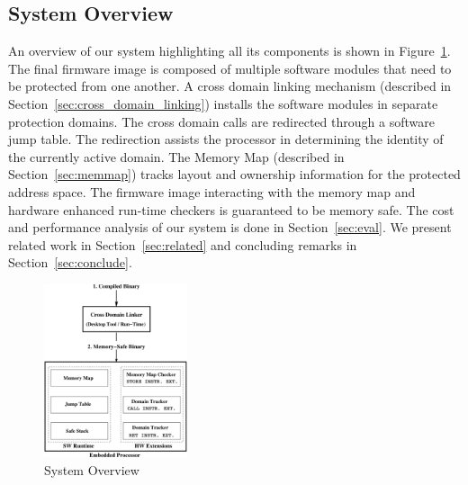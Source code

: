 \subsection{System Overview}
%
An overview of our system highlighting all its components is shown in Figure~\ref{fig:sys_overview}.
%
The final firmware image is composed of multiple software modules that need to be protected from one another.
%
%
A cross domain linking mechanism (described in Section~\ref{sec:cross_domain_linking}) installs the software modules in separate protection domains.
%
The cross domain calls are redirected through a software jump table.
%
The redirection assists the processor in determining the identity of the currently active domain.
%
The Memory Map (described in Section~\ref{sec:memmap}) tracks layout and ownership information for the protected address space.
%
The firmware image interacting with the memory map and hardware enhanced run-time checkers is guaranteed to be memory safe.
%
The cost and performance analysis of our system is done in Section~\ref{sec:eval}.
%
We present related work in Section~\ref{sec:related} and concluding remarks in Section~\ref{sec:conclude}.
%
\begin{figure}[htbp]
   \centering
   \includegraphics[height = 2.0in, keepaspectratio=true]{figures/sysoverview.pdf} 
   \caption{System Overview}
   \label{fig:sys_overview}
\end{figure}
%






